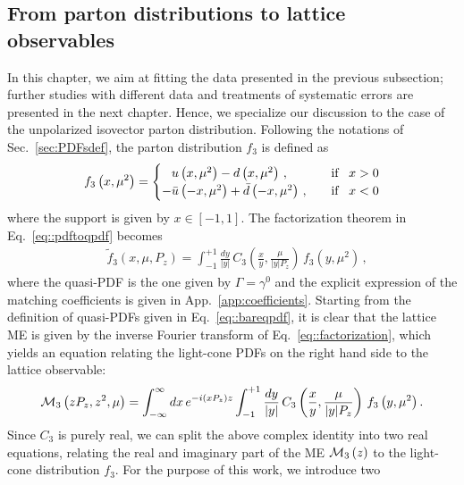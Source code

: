 \subsection{From parton distributions to lattice observables}
\label{subsec:thpredictions}
In this chapter, we aim at fitting the data presented in the previous subsection;
further studies with different data and treatments of systematic
errors are presented in the next chapter. Hence, we specialize our discussion
to the case of the unpolarized isovector parton distribution. Following the
notations of Sec.~\ref{sec:PDFsdef}, the parton distribution $f_{3}$ is
defined as
\begin{align}
	f_{3}\lp x, \mu^2 \rp = 
	\begin{cases}
      \phantom{-} u\lp x, \mu^2 \rp - d\lp x, \mu^2\rp\, , \quad                 %
      &\text{if} \,\,\,\,\, x > 0 \\
      -\bar{u}\lp -x, \mu^2 \rp + \bar{d}\lp -x, \mu^2 \rp\, , \quad %
      &\text{if} \,\,\,\,\, x < 0 
	\end{cases}
\end{align} 
where the support is given by $x\in \left[ -1, 1 \right]$. The factorization
theorem in Eq.~\eqref{eq::pdftoqpdf} becomes
\begin{align}
	\label{eq::factorization}
	  & \tilde{f}_{3}\left(x,\mu,P_z\right) = \int_{-1}^{+1} \frac{dy}{|y|}\,C_3\left(\frac{x}{y},\frac{\mu}{|y|P_z}\right)\, 
	  f_{3}\left(y,\mu^2\right)\, ,
\end{align}
where the quasi-PDF is the one given by $\Gamma = \gamma^0$ and the explicit
expression of the matching coefficients is given in
App.~\ref{app:coefficients}. Starting from the definition of quasi-PDFs
given in Eq.~\eqref{eq::bareqpdf}, it is clear that the lattice ME is given by the
inverse Fourier transform of Eq.~\eqref{eq::factorization}, which yields an
equation relating the light-cone PDFs on the right hand side to the lattice observable:
\begin{align}
	\label{eq:factorisedME}
	\mathcal{M}_{3}\left( z P_z, z^2,\mu\right) = 
	\int_{-\infty}^{\infty} dx \, e^{-i \left( x P_z \right) z} 
	\int_{-1}^{+1} \frac{dy}{|y|}\,
	C_3\left(\frac{x}{y},\frac{\mu}{|y|P_z}\right)\, 
	f_{3}\left(y,\mu^2\right). 
\end{align}
Since $C_3$ is purely real, we can split the above complex identity into two real equations, relating the
real and imaginary part of the ME $\mathcal{M}_{3}\left( z \right)$ to the
light-cone distribution $f_{3}$. For the purpose of this work, we introduce two
